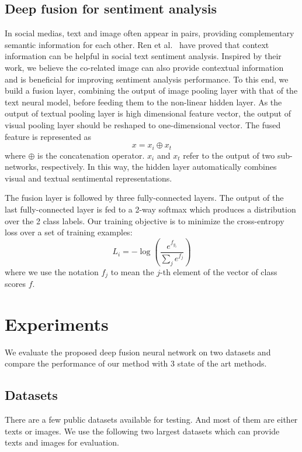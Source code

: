 \documentclass{article}
\begin{document}
  \subsection{Deep fusion for sentiment analysis}
 \label{ssec:subhead}
In social medias, text and image often appear in pairs, providing complementary semantic information for each other. Ren et al.~\cite{ren2016context} have proved that context information can be helpful in social text sentiment analysis. Inspired by their work, we  believe the co-related image can also provide contextual information and is beneficial for improving sentiment analysis performance. To this end, we build a fusion layer,  combining the output of image pooling layer with that of the text neural model, before feeding them to the non-linear hidden layer. As the output of textual pooling layer is high dimensional feature vector, the output of visual pooling layer should be reshaped to one-dimensional vector. The fused feature is represented as
  \begin{equation}
  x = x_i \oplus x_t
  \end{equation}
where $\oplus$ is the concatenation operator. $x_i$ and $x_t$ refer to the output of two sub-networks, respectively. In this way, the hidden layer automatically combines visual and textual sentimental representations.

The fusion layer is followed by three fully-connected layers. The output of the last fully-connected layer is fed to a 2-way softmax which produces a distribution over the 2 class labels. Our training objective is to minimize the cross-entropy loss over a set of training examples:
  \begin{equation}
  L_i = -\log \left( \frac{e^{f_{y_i}}}{\sum_je^{f_j}} \right)
  \end{equation}
where we use the notation $f_j$ to mean the $j$-th element of the vector of class scores $f$.

\section{Experiments}
\label{sec:majhead}
We evaluate the proposed deep fusion neural network on two datasets and compare the performance of our method with 3 state of the art methods.
\vspace{-0.3cm}
  \subsection{Datasets}
 \label{ssec:subhead}
There are a few public datasets available for testing. And most of them are either texts or images. We use the following two largest datasets which can provide texts and images for evaluation.
\end{document}
